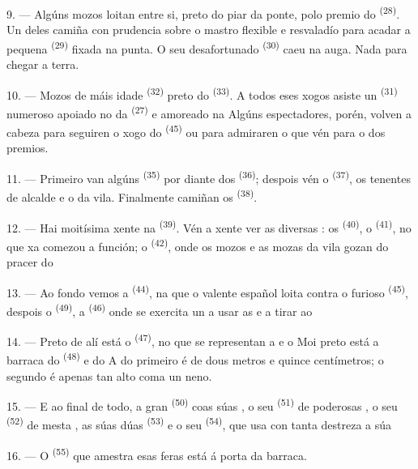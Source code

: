 9. --- Algúns mozos loitan entre si, preto do piar da ponte, polo premio do
 \textsuperscript{(28)}. Un deles camiña con prudencia sobre
o mastro flexible e resvaladío para acadar a pequena  \textsuperscript{(29)}
fixada na punta. O seu desafortunado  \textsuperscript{(30)} caeu na auga.
Nada para chegar a terra.

10. --- Mozos de máis idade  \textsuperscript{(32)} preto do
 \textsuperscript{(33)}. A todos eses xogos asiste un 
\textsuperscript{(31)} numeroso apoiado no  da 
\textsuperscript{(27)} e amoreado na  Algúns espectadores, porén, volven a
cabeza para seguiren o xogo do  \textsuperscript{(45)} ou para
admiraren o  que vén para o  dos premios.

11. --- Primeiro van algúns  \textsuperscript{(35)} por diante dos
 \textsuperscript{(36)}; despois vén o 
\textsuperscript{(37)}, os tenentes de alcalde e o  da vila. Finalmente
camiñan os  \textsuperscript{(38)}.

\VUsaut{5.0mm}
\VUsaut{3.6mm}

12. --- Hai moitísima xente na  \textsuperscript{(39)}. Vén a xente ver
as diversas : os  \textsuperscript{(40)}, o
 \textsuperscript{(41)}, no que xa comezou a función; o 
\textsuperscript{(42)}, onde os mozos e as mozas da vila gozan do pracer do 

13. --- Ao fondo vemos a  \textsuperscript{(44)}, na que o valente
 español loita contra o furioso  \textsuperscript{(45)}, despois
o  \textsuperscript{(49)}, a
 \textsuperscript{(46)} onde se exercita un a usar as
 e a tirar ao 

14. --- Preto de alí está o  \textsuperscript{(47)}, no que se
representan a  e o  Moi preto está a barraca do
 \textsuperscript{(48)} e do  A  do
primeiro é de dous metros e quince centímetros; o segundo é apenas tan alto coma un neno.

15. --- E ao final de todo, a gran  \textsuperscript{(50)} coas súas
, o seu  \textsuperscript{(51)} de poderosas
, o seu  \textsuperscript{(52)} de mesta ,
as súas dúas  \textsuperscript{(53)} e o seu 
\textsuperscript{(54)}, que usa con tanta destreza a súa 

16. --- O  \textsuperscript{(55)} que amestra esas feras está á porta da
barraca.

